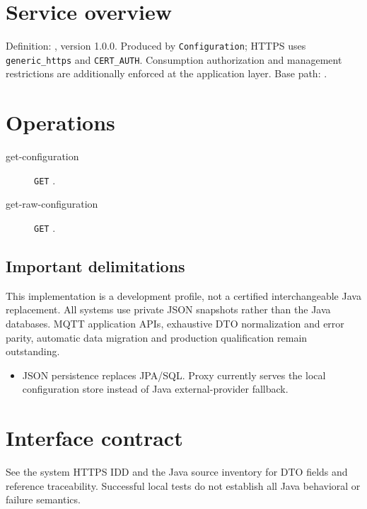 \documentclass[a4paper]{arrowhead}
\begin{document}
\ArrowheadSetup
\section{Service overview}
Definition: , version 1.0.0. Produced by \texttt{Configuration}; HTTPS uses \texttt{generic\_https} and \texttt{CERT\_AUTH}. Consumption authorization and management restrictions are additionally enforced at the application layer. Base path: .
\section{Operations}
\begin{description}
\item[get-configuration] \texttt{GET} .
\item[get-raw-configuration] \texttt{GET} .
\end{description}
\subsection{Important delimitations}
This implementation is a development profile, not a certified interchangeable Java replacement. All systems use private JSON snapshots rather than the Java databases. MQTT application APIs, exhaustive DTO normalization and error parity, automatic data migration and production qualification remain outstanding.
\begin{itemize}
\item JSON persistence replaces JPA/SQL. Proxy currently serves the local configuration store instead of Java external-provider fallback.
\end{itemize}
\section{Interface contract}
See the system HTTPS IDD and the Java source inventory for DTO fields and reference traceability. Successful local tests do not establish all Java behavioral or failure semantics.
\end{document}
